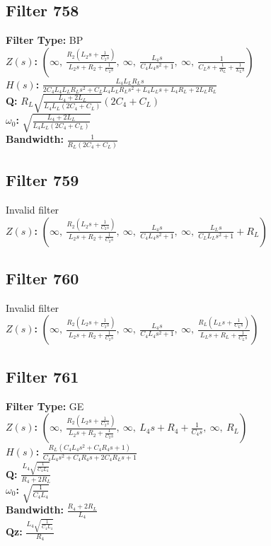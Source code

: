 \documentclass{article}
\begin{document}
\subsection*{Filter 758}
\textbf{Filter Type:} BP \\ 
\textbf{$Z(s)$:} $\left( \infty, \  \frac{R_{2} \left(L_{2} s + \frac{1}{C_{2} s}\right)}{L_{2} s + R_{2} + \frac{1}{C_{2} s}}, \  \infty, \  \frac{L_{4} s}{C_{4} L_{4} s^{2} + 1}, \  \infty, \  \frac{1}{C_{L} s + \frac{1}{R_{L}} + \frac{1}{L_{L} s}}\right)$ \\ 
\textbf{$H(s)$:} $\frac{L_{4} L_{L} R_{L} s}{2 C_{4} L_{4} L_{L} R_{L} s^{2} + C_{L} L_{4} L_{L} R_{L} s^{2} + L_{4} L_{L} s + L_{4} R_{L} + 2 L_{L} R_{L}}$ \\ 
\textbf{Q:} $R_{L} \sqrt{\frac{L_{4} + 2 L_{L}}{L_{4} L_{L} \left(2 C_{4} + C_{L}\right)}} \left(2 C_{4} + C_{L}\right)$ \\ 
\textbf{$\omega_0$:} $\sqrt{\frac{L_{4} + 2 L_{L}}{L_{4} L_{L} \left(2 C_{4} + C_{L}\right)}}$ \\ 
\textbf{Bandwidth:} $\frac{1}{R_{L} \left(2 C_{4} + C_{L}\right)}$ \\ 
\subsection*{Filter 759}
Invalid filter \\ 
\textbf{$Z(s)$:} $\left( \infty, \  \frac{R_{2} \left(L_{2} s + \frac{1}{C_{2} s}\right)}{L_{2} s + R_{2} + \frac{1}{C_{2} s}}, \  \infty, \  \frac{L_{4} s}{C_{4} L_{4} s^{2} + 1}, \  \infty, \  \frac{L_{L} s}{C_{L} L_{L} s^{2} + 1} + R_{L}\right)$ \\ 
\subsection*{Filter 760}
Invalid filter \\ 
\textbf{$Z(s)$:} $\left( \infty, \  \frac{R_{2} \left(L_{2} s + \frac{1}{C_{2} s}\right)}{L_{2} s + R_{2} + \frac{1}{C_{2} s}}, \  \infty, \  \frac{L_{4} s}{C_{4} L_{4} s^{2} + 1}, \  \infty, \  \frac{R_{L} \left(L_{L} s + \frac{1}{C_{L} s}\right)}{L_{L} s + R_{L} + \frac{1}{C_{L} s}}\right)$ \\ 
\subsection*{Filter 761}
\textbf{Filter Type:} GE \\ 
\textbf{$Z(s)$:} $\left( \infty, \  \frac{R_{2} \left(L_{2} s + \frac{1}{C_{2} s}\right)}{L_{2} s + R_{2} + \frac{1}{C_{2} s}}, \  \infty, \  L_{4} s + R_{4} + \frac{1}{C_{4} s}, \  \infty, \  R_{L}\right)$ \\ 
\textbf{$H(s)$:} $\frac{R_{L} \left(C_{4} L_{4} s^{2} + C_{4} R_{4} s + 1\right)}{C_{4} L_{4} s^{2} + C_{4} R_{4} s + 2 C_{4} R_{L} s + 1}$ \\ 
\textbf{Q:} $\frac{L_{4} \sqrt{\frac{1}{C_{4} L_{4}}}}{R_{4} + 2 R_{L}}$ \\ 
\textbf{$\omega_0$:} $\sqrt{\frac{1}{C_{4} L_{4}}}$ \\ 
\textbf{Bandwidth:} $\frac{R_{4} + 2 R_{L}}{L_{4}}$ \\ 
\textbf{Qz:} $\frac{L_{4} \sqrt{\frac{1}{C_{4} L_{4}}}}{R_{4}}$ \\ 
\end{document}
